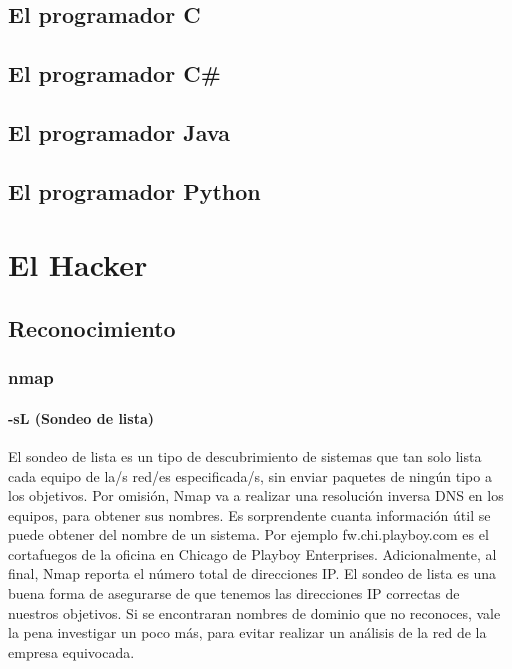 \documentclass[a4paper, 11pt, titlepage]{book}
\begin{document}
    \section{El programador C}

    \section{El programador C\#}

    \section{El programador Java}

    \section{El programador Python}

\chapter{El Hacker}

    \section{Reconocimiento}
            
        \subsection{nmap}


            \subsubsection{-sL (Sondeo de lista)} El sondeo de lista es un tipo de descubrimiento
            de sistemas que tan solo lista cada equipo de la/s red/es especificada/s, sin enviar paquetes 
            de ningún tipo a los objetivos. Por omisión, Nmap va a realizar una resolución inversa DNS en 
            los equipos, para obtener sus nombres. Es sorprendente cuanta información útil se puede obtener 
            del nombre de un sistema. Por ejemplo fw.chi.playboy.com es el cortafuegos de la oficina en 
            Chicago de Playboy Enterprises. Adicionalmente, al final, Nmap reporta el número total de 
            direcciones IP. El sondeo de lista es una buena forma de asegurarse de que tenemos las 
            direcciones IP correctas de nuestros objetivos. Si se encontraran nombres de dominio que no 
            reconoces, vale la pena investigar un poco más, para evitar realizar un análisis de la red 
            de la empresa equivocada.
\end{document}
